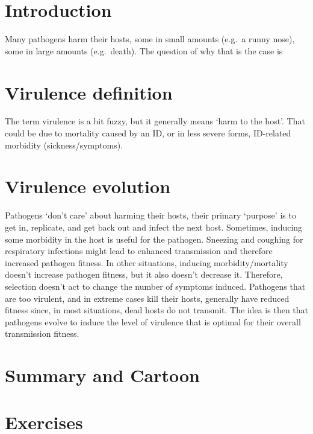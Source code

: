 \documentclass[
]{book}
\begin{document}
\hypertarget{introduction-16}{%
\section{Introduction}\label{introduction-16}}

Many pathogens harm their hosts, some in small amounts (e.g.~a runny nose), some in large amounts (e.g.~death). The question of why that is the case is

\hypertarget{virulence-definition}{%
\section{Virulence definition}\label{virulence-definition}}

The term virulence is a bit fuzzy, but it generally means `harm to the host'. That could be due to mortality caused by an ID, or in less severe forms, ID-related morbidity (sickness/symptoms).

\hypertarget{virulence-evolution}{%
\section{Virulence evolution}\label{virulence-evolution}}

Pathogens `don't care' about harming their hosts, their primary `purpose' is to get in, replicate, and get back out and infect the next host. Sometimes, inducing some morbidity in the host is useful for the pathogen. Sneezing and coughing for respiratory infections might lead to enhanced transmission and therefore increased pathogen fitness. In other situations, inducing morbidity/mortality doesn't increase pathogen fitness, but it also doesn't decrease it. Therefore, selection doesn't act to change the number of symptoms induced. Pathogens that are too virulent, and in extreme cases kill their hosts, generally have reduced fitness since, in most situations, dead hosts do not transmit. The idea is then that pathogens evolve to induce the level of virulence that is optimal for their overall transmission fitness.

\hypertarget{summary-and-cartoon-16}{%
\section{Summary and Cartoon}\label{summary-and-cartoon-16}}

\hypertarget{exercises-16}{%
\section{Exercises}\label{exercises-16}}
\end{document}
